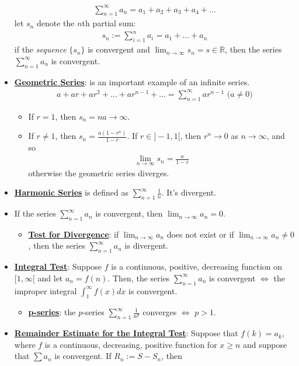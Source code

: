 \documentclass[11pt]{article}
\newcommand{\dfn}[1]{\underline{\textbf{#1}}}
\newcommand{\R}[0]{\mathbb{R}}
\begin{document}
\begin{itemize}[noitemsep]
	\begin{align*}
		\sum_{n=1}^\infty a_n = a_1 + a_2 + a_3 + a_4 + ... 
	\end{align*}
	let $s_n$ denote the $n$th partial sum: 
	\begin{align*}
		s_n := \sum_{i=1}^n a_i = a_1 + ... + a_n 
	\end{align*}
	if the \emph{sequence} $\{ s_n \}$ is convergent and $\lim_{n \rightarrow \infty} s_n = s \in \R$, then the series $\sum_{n=1}^\infty a_n$ is convergent. 
	\item \dfn{Geometric Series}: is an important example of an infinite series.
	\begin{align}
		a + ar + ar^2 + ... + ar^{n-1} + ... = \sum_{n=1}^\infty ar^{n-1} \text{ ($a \neq 0$)} 	
	\end{align}
	\begin{itemize}[noitemsep]
		\item If $r=1$, then $s_n = na \rightarrow \infty$. 
		\item If $r \neq 1$, then $s_n = \frac{a(1-r^n)}{1-r}$. If $ r \in ]-1, 1[$, then $r^n \rightarrow 0 $ as $n \rightarrow \infty$, and so 
		\begin{align}
			\lim_{n \rightarrow \infty} s_n = \frac{a}{1-r}	
		\end{align}
		otherwise the geometric series diverges. 
	\end{itemize}
	\item \dfn{Harmonic Series} is defined as $\sum_{n=1}^\infty \frac{1}{n}$. It's divergent. 
	\item If the series $\sum_{n=1}^\infty a_n$ is convergent, then $\lim_{n \rightarrow \infty} a_n =0$. 
	\begin{itemize}
		\item \dfn{Test for Divergence}: if $\lim_{n \rightarrow \infty} a_n$ does not exist or if $\lim_{n \rightarrow \infty} a_n \neq 0$, then the series $\sum_{n=1}^\infty a_n$ is divergent.
	\end{itemize}
	\item \dfn{Integral Test}: Suppose $f$ is a continuous, positive, decreasing function on $[1, \infty[$ and let $a_n = f(n)$. Then, the series $\sum_{n=1}^\infty a_n$ is convergent $\iff$ the improper integral $\int_1^\infty f(x) dx $ is convergent. 
	\begin{itemize}
		\item \dfn{p-series}: the $p$-series $\sum_{n=1}^\infty \frac{1}{n^p}$ converges $\iff$ $p >1$. 
	\end{itemize}
	\item \dfn{Remainder Estimate for the Integral Test}: Suppose that $f(k) = a_k$, where $f$ is a continuous, decreasing, positive function for $x \geq n$ and suppose that $\sum a_n$ is convergent. If $R_n := S - S_n$, then

\end{itemize}
\end{document}
